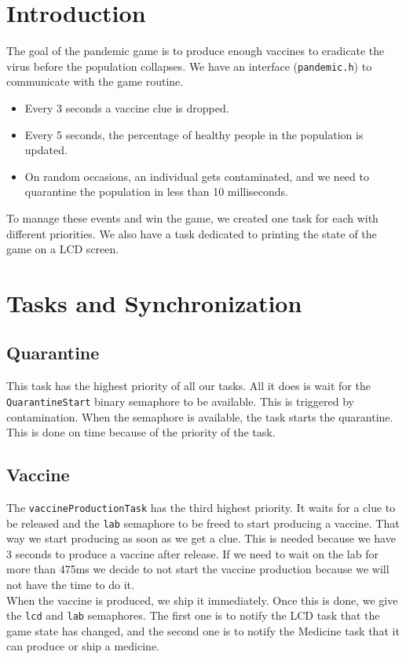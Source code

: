 \documentclass[a4paper, twoside, 12pt]{article}
\begin{document}
\section{Introduction}
The goal of the pandemic game is to produce enough vaccines to eradicate the virus
before the population collapses. We have an interface (\texttt{pandemic.h})
to communicate with the game routine.
\begin{itemize}
	\setlength\itemsep{0em}
	\item Every 3 seconds a vaccine clue is dropped.
	\item Every 5 seconds, the percentage of healthy people in the population is updated.
	\item On random occasions, an individual gets contaminated, and we need to quarantine the population in less than 10 milliseconds.
\end{itemize}
To manage these events and win the game, we created one task for each with different
priorities. We also have a task dedicated to printing the state of the game on a LCD screen.

\section{Tasks and Synchronization}
\subsection{Quarantine}
This task has the highest priority of all our tasks. All it does is wait for the
\texttt{QuarantineStart} binary semaphore to be available. This is triggered by contamination.
When the semaphore is available, the task starts the quarantine. This is done on time because
of the priority of the task.

\subsection{Vaccine}
The \texttt{vaccineProductionTask} has the third highest priority. It waits for a clue to be
released and the \texttt{lab} semaphore to be freed to start producing a vaccine.
That way we start producing as soon as we get a clue. This is needed because we have 3 seconds to produce a vaccine after release. If we need to wait on the lab for more than 475ms we decide to not start the vaccine production because we will not have the time to do it.\\
When the vaccine is produced, we ship it immediately. Once this is done, we give the \texttt{lcd}
and \texttt{lab} semaphores. The first one is to notify the LCD task that the game state has changed,
and the second one is to notify the Medicine task that it can produce or ship a medicine.
\end{document}
